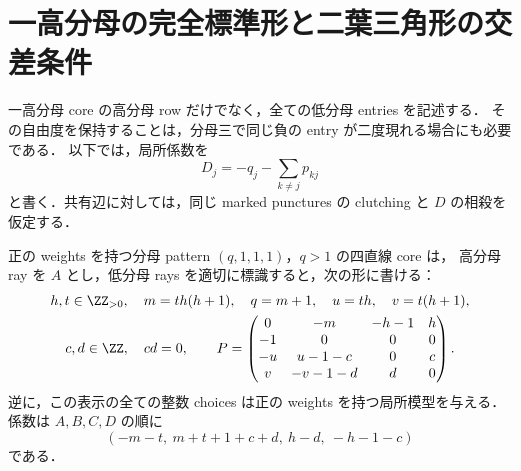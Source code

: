 
\section{一高分母の完全標準形と二葉三角形の交差条件}
\label{tl15:section}

一高分母 core の高分母 row だけでなく，全ての低分母 entries を記述する．
その自由度を保持することは，分母三で同じ負の entry が二度現れる場合にも必要である．
以下では，局所係数を
\[
 D_j=-q_j-\sum_{k\ne j}p_{kj}
\]
と書く．共有辺に対しては，同じ marked punctures の clutching と
$D$ の相殺を仮定する．

\begin{proposition}
\label{tl15:one-high-full}
正の weights を持つ分母 pattern $(q,1,1,1)$，$q>1$ の四直線 core は，
高分母 ray を $A$ とし，低分母 rays を適切に標識すると，次の形に書ける：
\begin{equation}\label{tl15:leaf-matrix}
\begin{gathered}
 h,t\in\ZZ_{>0},\quad m=th(h+1),\quad q=m+1,\quad
 u=th,\quad v=t(h+1),\\
 c,d\in\ZZ,\quad cd=0,\qquad
 P=\begin{pmatrix}
 0&-m&-h-1&h\\
 -1&0&0&0\\
 -u&u-1-c&0&c\\
 v&-v-1-d&d&0
 \end{pmatrix}.
\end{gathered}
\end{equation}
逆に，この表示の全ての整数 choices は正の weights を持つ局所模型を与える．
係数は $A,B,C,D$ の順に
\begin{equation}\label{tl15:leaf-D}
 (-m-t,\ m+t+1+c+d,\ h-d,\ -h-1-c)
\end{equation}
である．
\end{proposition}

